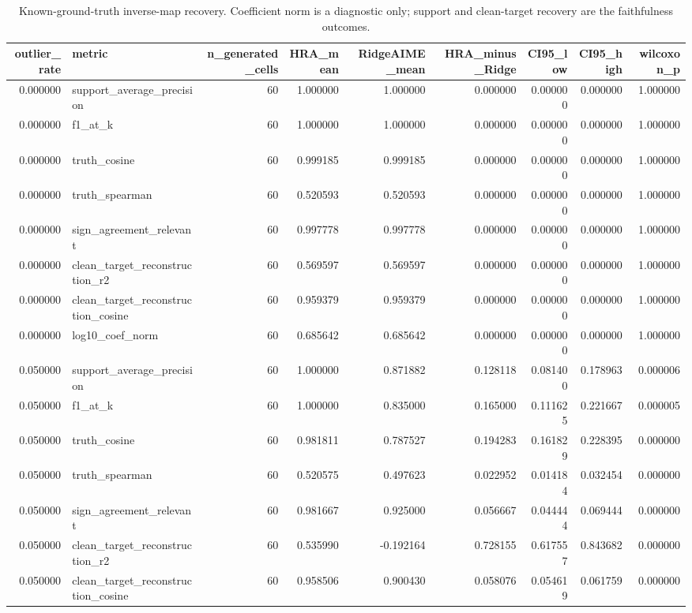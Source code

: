 \begin{table}[t]
\caption{Known-ground-truth inverse-map recovery. Coefficient norm is a diagnostic only; support and clean-target recovery are the faithfulness outcomes.}
\label{tab:r5_final_synthetic_ground_truth_ci}
\begin{tabular}{rlrrrrrrr}
\toprule
outlier_rate & metric & n_generated_cells & HRA_mean & RidgeAIME_mean & HRA_minus_Ridge & CI95_low & CI95_high & wilcoxon_p \\
\midrule
0.000000 & support_average_precision & 60 & 1.000000 & 1.000000 & 0.000000 & 0.000000 & 0.000000 & 1.000000 \\
0.000000 & f1_at_k & 60 & 1.000000 & 1.000000 & 0.000000 & 0.000000 & 0.000000 & 1.000000 \\
0.000000 & truth_cosine & 60 & 0.999185 & 0.999185 & 0.000000 & 0.000000 & 0.000000 & 1.000000 \\
0.000000 & truth_spearman & 60 & 0.520593 & 0.520593 & 0.000000 & 0.000000 & 0.000000 & 1.000000 \\
0.000000 & sign_agreement_relevant & 60 & 0.997778 & 0.997778 & 0.000000 & 0.000000 & 0.000000 & 1.000000 \\
0.000000 & clean_target_reconstruction_r2 & 60 & 0.569597 & 0.569597 & 0.000000 & 0.000000 & 0.000000 & 1.000000 \\
0.000000 & clean_target_reconstruction_cosine & 60 & 0.959379 & 0.959379 & 0.000000 & 0.000000 & 0.000000 & 1.000000 \\
0.000000 & log10_coef_norm & 60 & 0.685642 & 0.685642 & 0.000000 & 0.000000 & 0.000000 & 1.000000 \\
0.050000 & support_average_precision & 60 & 1.000000 & 0.871882 & 0.128118 & 0.081400 & 0.178963 & 0.000006 \\
0.050000 & f1_at_k & 60 & 1.000000 & 0.835000 & 0.165000 & 0.111625 & 0.221667 & 0.000005 \\
0.050000 & truth_cosine & 60 & 0.981811 & 0.787527 & 0.194283 & 0.161829 & 0.228395 & 0.000000 \\
0.050000 & truth_spearman & 60 & 0.520575 & 0.497623 & 0.022952 & 0.014184 & 0.032454 & 0.000000 \\
0.050000 & sign_agreement_relevant & 60 & 0.981667 & 0.925000 & 0.056667 & 0.044444 & 0.069444 & 0.000000 \\
0.050000 & clean_target_reconstruction_r2 & 60 & 0.535990 & -0.192164 & 0.728155 & 0.617557 & 0.843682 & 0.000000 \\
0.050000 & clean_target_reconstruction_cosine & 60 & 0.958506 & 0.900430 & 0.058076 & 0.054619 & 0.061759 & 0.000000 \\

\end{tabular}
\end{table}
